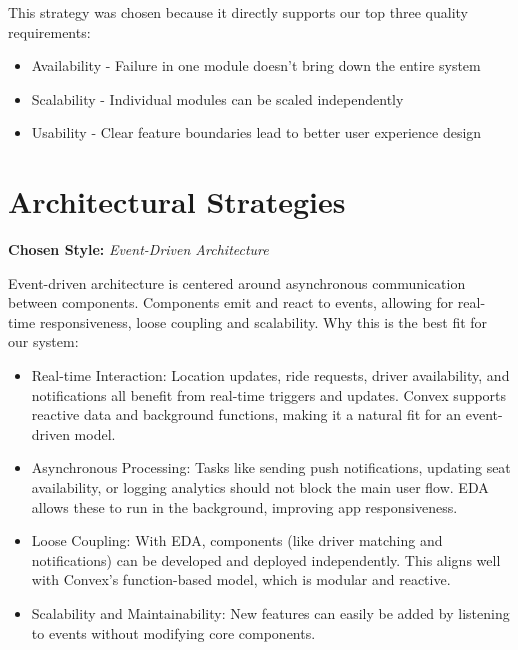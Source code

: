 \documentclass[12pt]{article}
\begin{document}
This strategy was chosen because it directly supports our top three quality requirements:

\begin{itemize}
\item Availability - Failure in one module doesn't bring down the entire system
\item Scalability - Individual modules can be scaled independently
\item Usability - Clear feature boundaries lead to better user experience design
\end{itemize}

\section{Architectural Strategies}
\textbf{Chosen Style:} \textit{Event-Driven Architecture}

Event-driven architecture is centered around asynchronous communication between components. Components emit and react to events, allowing for real-time responsiveness, loose coupling and scalability.
Why this is the best fit for our system:

\begin{itemize}
  \item Real-time Interaction: Location updates, ride requests, driver availability, and notifications all benefit from real-time triggers and updates. Convex supports reactive data and background functions, making it a natural fit for an event-driven model.
  \item Asynchronous Processing: Tasks like sending push notifications, updating seat availability, or logging analytics should not block the main user flow. EDA allows these to run in the background, improving app responsiveness.
  \item Loose Coupling: With EDA, components (like driver matching and notifications) can be developed and deployed independently. This aligns well with Convex’s function-based model, which is modular and reactive.
  \item Scalability and Maintainability: New features can easily be added by listening to events without modifying core components.
\end{itemize}
\end{document}
